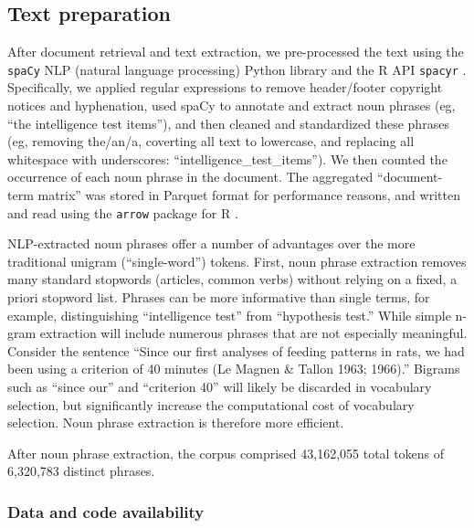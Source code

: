 \documentclass[12pt]{article}
\begin{document}
\hypertarget{text-preparation}{%
\subsection{Text preparation}\label{text-preparation}}

After document retrieval and text extraction, we pre-processed the text using the \texttt{spaCy} NLP (natural language processing) Python library \cite[version 1.9.0]{SpaCyIndustrialstrengthNatural2018} and the R API \texttt{spacyr} \cite[version 1.2.1]{BenoitSpacyrWrapperSpaCy2020}. Specifically, we applied regular expressions to remove header/footer copyright notices and hyphenation, used spaCy to annotate and extract noun phrases (eg, ``the intelligence test items''), and then cleaned and standardized these phrases (eg, removing the/an/a, coverting all text to lowercase, and replacing all whitespace with underscores: ``intelligence\_test\_items''). We then counted the occurrence of each noun phrase in the document. The aggregated ``document-term matrix'' was stored in Parquet format \cite{VohraApacheParquet2016} for performance reasons, and written and read using the \texttt{arrow} package for R \cite[version 7.0.0]{RichardsonArrowIntegrationApache2023}.

NLP-extracted noun phrases offer a number of advantages over the more traditional unigram (``single-word'') tokens. First, noun phrase extraction removes many standard stopwords (articles, common verbs) without relying on a fixed, a priori stopword list. Phrases can be more informative than single terms, for example, distinguishing ``intelligence test'' from ``hypothesis test.'' While simple n-gram extraction will include numerous phrases that are not especially meaningful. Consider the sentence ``Since our first analyses of feeding patterns in rats, we had been using a criterion of 40 minutes (Le Magnen \& Tallon 1963; 1966).''\cite{SclafaniCorrelationCausationStudy1981} Bigrams such as ``since our'' and ``criterion 40'' will likely be discarded in vocabulary selection, but significantly increase the computational cost of vocabulary selection. Noun phrase extraction is therefore more efficient.

After noun phrase extraction, the corpus comprised 43,162,055 total tokens of 6,320,783 distinct phrases.

\hypertarget{data-and-code-availability}{%
\subsubsection{Data and code availability}\label{data-and-code-availability}}
\end{document}
